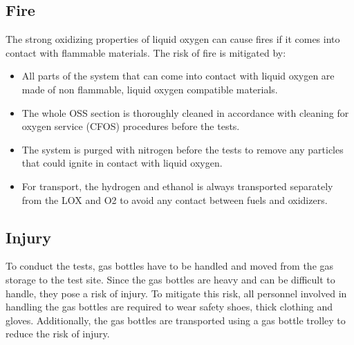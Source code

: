 \documentclass{article}
\begin{document}
\subsection{Fire}
The strong oxidizing properties of liquid oxygen can cause fires if it comes into contact with flammable materials. The risk of fire is mitigated by:
\begin{itemize}
    \item All parts of the system that can come into contact with liquid oxygen are made of non flammable, liquid oxygen compatible materials.
    \item The whole OSS section is thoroughly cleaned in accordance with cleaning for oxygen service (CFOS) procedures before the tests.
    \item The system is purged with nitrogen before the tests to remove any particles that could ignite in contact with liquid oxygen.
    \item For transport, the hydrogen and ethanol is always transported separately from the LOX and O2 to avoid any contact between fuels and oxidizers.
\end{itemize}

\subsection{Injury}
To conduct the tests, gas bottles have to be handled and moved from the gas storage to the test site. Since the gas bottles are heavy and can be difficult to handle, they pose a risk of injury. To mitigate this risk, all personnel involved in handling the gas bottles are required to wear safety shoes, thick clothing and gloves. Additionally, the gas bottles are transported using a gas bottle trolley to reduce the risk of injury.

\newpage
\end{document}
